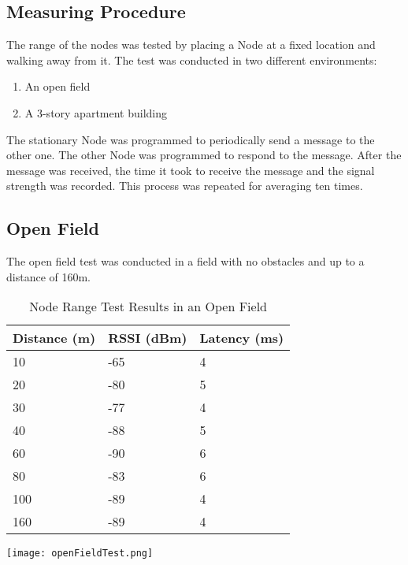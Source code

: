     \subsection{Measuring Procedure}
    The range of the nodes was tested by placing a Node at a fixed location
    and walking away from it. 
    The test was conducted in two different environments:
    \begin{enumerate}
        \item An open field
        \item A 3-story apartment building
    \end{enumerate}

    The stationary Node was programmed to periodically send a
    message to the other one. The other Node was programmed to
    respond to the message. After the message was received,
    the time it took to receive the message and the 
    signal strength was recorded. 
    This process was repeated for averaging ten times.

    \subsection{Open Field}
    The open field test was conducted in a field with no obstacles
    and up to a distance of 160m.
    \vspace{1cm}

    \begin{table}[H]
        \centering
        \begin{minipage}{0.40\textwidth} %
            \centering
            \begin{tabular}{|p{2cm}|p{1.6cm}|p{1.6cm}|}
                \hline
                \textbf{Distance (m)} & \textbf{RSSI (dBm)} & \textbf{Latency (ms)} \\ \hline
                10  & -65 & 4 \\ \hline
                20  & -80 & 5 \\ \hline
                30  & -77 & 4 \\ \hline
                40  & -88 & 5 \\ \hline
                60  & -90 & 6 \\ \hline
                80  & -83 & 6 \\ \hline
                100 & -89 & 4 \\ \hline
                160 & -89 & 4 \\ \hline
            \end{tabular}
            \label{tab:node_range_test}
        \end{minipage}%
        \hfill %
        \begin{minipage}{0.55\textwidth} %
            \centering
            \texttt{[image: openFieldTest.png]}
            \label{fig:node_range_test}
        \end{minipage}
        \caption{Node Range Test Results in an Open Field}
    \end{table}

